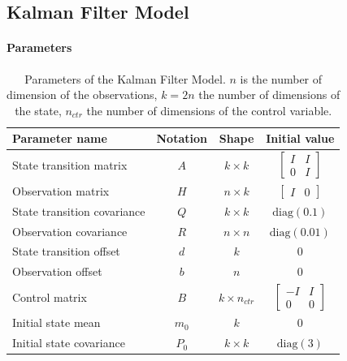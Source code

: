 \documentclass{article}
\let\Oldsubsection\subsection
\renewcommand{\subsection}{\FloatBarrier\Oldsubsection}
\begin{document}
\subsection{Kalman Filter Model}

\paragraph{Parameters}

\begin{table}[H]
\caption{Parameters of the Kalman Filter Model. $n$ is the number of dimension of the observations, $k = 2n$ the number of dimensions of the state, $n_{ctr}$ the number of dimensions of the control variable.}
\label{table:parameters}
\vspace{5pt}
\centering
\begin{tabular}{l c c c}
\toprule
    \bfseries Parameter name & \bfseries Notation & \bfseries Shape & \bfseries Initial value\\
    \hline
    \noalign{\vspace{4pt}}
    State transition matrix & $A$ & $k \times k$ & $\begin{bmatrix}I & I \\ 0 & I\end{bmatrix}$ \\
    \noalign{\vspace{4pt}}
    Observation matrix & $H$ & $n \times k$ & $\begin{bmatrix}I & 0 \end{bmatrix}$ \\
    \noalign{\vspace{4pt}}
    State transition covariance & $Q$ & $k \times k$ & $\text{diag}(0.1)$ \\
    \noalign{\vspace{4pt}}
    Observation covariance & $R$ & $n \times n$ & $\text{diag}(0.01)$\\
    \noalign{\vspace{4pt}}
    State transition offset & $d$ & $k$ & 0 \\
    \noalign{\vspace{4pt}}
    Observation offset & $b$ & $n$ & 0 \\
    \noalign{\vspace{4pt}}
    Control matrix & $B$ & $k \times n_{ctr}$ & $\begin{bmatrix} -I & I \\ 0 & 0 \end{bmatrix}$ \\
    \noalign{\vspace{4pt}}
    Initial state mean & $m_0$ & $k$ & $0$ \\
    \noalign{\vspace{4pt}}
    Initial state covariance & $P_0$ & $k \times k$ & $\text{diag}(3)$ \\
\bottomrule
\end{tabular}
\end{table}
\end{document}
